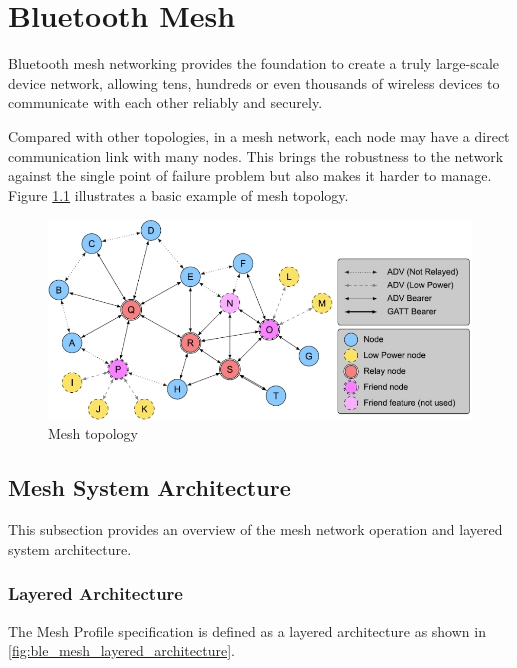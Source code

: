 \documentclass[\main/main.tex]{subfiles}
\begin{document}
\graphicspath{{img/}{ble_mesh/img/}}

\chapter{Bluetooth Mesh}

Bluetooth mesh networking provides the foundation to create a truly large-scale device network, allowing tens, hundreds or even thousands of wireless devices to communicate with each other reliably and securely.

Compared with other topologies, in a mesh network, each node may have a direct communication link with many nodes. This brings the robustness to the network against the single point of failure problem but also makes it harder to manage. Figure \ref{fig:Mesh topology} illustrates a basic example of mesh topology.

\begin{figure}[H]
    \begin{center}
        \includegraphics[scale=0.7]{mesh_topology.jpg}
    \end{center}
    \caption{Mesh topology}
    \label{fig:Mesh topology}
\end{figure}


\section{Mesh System Architecture}
This subsection provides an overview of the mesh network operation and layered system architecture.

\subsection{Layered Architecture \cite{bluetooth_sig:mesh_profile_specification_1_0_1}}

The Mesh Profile specification is defined as a layered architecture as shown in \ref{fig:ble_mesh_layered_architecture}.
\end{document}
